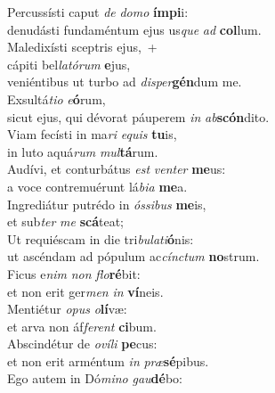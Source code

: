 \evenverse Percussísti caput \textit{de} \textit{do}\textit{mo} \textbf{ím}\textbf{pi}i:~\*\\
\evenverse denudásti fundaméntum ejus us\textit{que} \textit{ad} \textbf{col}lum.\\
\oddverse Maledixísti sceptris ejus,~+\\
\oddverse  cápiti bel\textit{la}\textit{tó}\textit{rum} \textbf{e}jus,~\*\\
\oddverse veniéntibus ut turbo ad \textit{di}\textit{sper}\textbf{gén}dum me.\\
\evenverse Exsultá\textit{ti}\textit{o} \textit{e}\textbf{ó}rum,~\*\\
\evenverse sicut ejus, qui dévorat páuperem \textit{in} \textit{ab}\textbf{scón}dito.\\
\oddverse Viam fecísti in ma\textit{ri} \textit{e}\textit{quis} \textbf{tu}is,~\*\\
\oddverse in luto aquá\textit{rum} \textit{mul}\textbf{tá}rum.\\
\evenverse Audívi, et conturbátus \textit{est} \textit{ven}\textit{ter} \textbf{me}us:~\*\\
\evenverse a voce contremuérunt lá\textit{bi}\textit{a} \textbf{me}a.\\
\oddverse Ingrediátur putrédo in \textit{ós}\textit{si}\textit{bus} \textbf{me}is,~\*\\
\oddverse et sub\textit{ter} \textit{me} \textbf{scá}teat;\\
\evenverse Ut requiéscam in die tri\textit{bu}\textit{la}\textit{ti}\textbf{ó}nis:~\*\\
\evenverse ut ascéndam ad pópulum ac\textit{cín}\textit{ctum} \textbf{no}strum.\\
\oddverse Ficus e\textit{nim} \textit{non} \textit{flo}\textbf{ré}bit:~\*\\
\oddverse et non erit ger\textit{men} \textit{in} \textbf{ví}neis.\\
\evenverse Mentiétur \textit{o}\textit{pus} \textit{o}\textbf{lí}væ:~\*\\
\evenverse et arva non áf\textit{fe}\textit{rent} \textbf{ci}bum.\\
\oddverse Abscindétur de \textit{o}\textit{ví}\textit{li} \textbf{pe}cus:~\*\\
\oddverse et non erit arméntum \textit{in} \textit{præ}\textbf{sé}pibus.\\
\evenverse Ego autem in Dó\textit{mi}\textit{no} \textit{gau}\textbf{dé}bo:~\*\\
